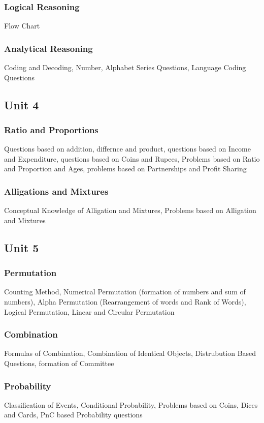 \documentclass{article}
\begin{document}
\begin{multicols*}{2}
    \subsubsection*{Logical Reasoning}
    Flow Chart
    \subsubsection*{Analytical Reasoning}
    Coding and Decoding, Number, Alphabet Series Questions, Language Coding Questions
    \subsection*{Unit 4}
    \subsubsection*{Ratio and Proportions}
    Questions based on addition, differnce and product, questions based on Income and Expenditure, questions based on Coins and Rupees, Problems based on Ratio and Proportion and Ages, problems based on Partnerships and Profit Sharing
    \subsubsection*{Alligations and Mixtures}
    Conceptual Knowledge of Alligation and Mixtures, Problems based on Alligation and Mixtures
    \subsection*{Unit 5}
    \subsubsection*{Permutation}
    Counting Method, Numerical Permutation (formation of numbers and sum of numbers), Alpha Permutation (Rearrangement of words and Rank of Words), Logical Permutation, Linear and Circular Permutation
    \subsubsection*{Combination}
    Formulas of Combination, Combination of Identical Objects, Distrubution Based Questions, formation of Committee
    \subsubsection*{Probability}
    Classification of Events, Conditional Probability, Problems based on Coins, Dices and Cards, PnC based Probability questions

\end{multicols*}
\end{document}
